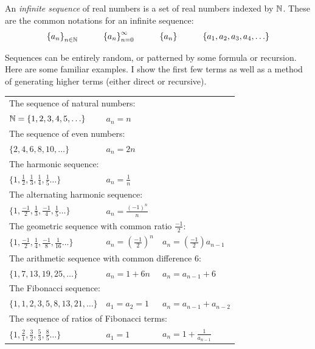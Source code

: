 \documentclass[fleqn]{report}
\begin{document}
\begin{defn}An \emph{infinite sequence} of real numbers is a set of real
numbers indexed by $\mathbb{N}$. These are the common notations for an
infinite sequence: 
\begin{equation*}
\left\{ a_n \right\}_{n \in \mathbb{N}} \hspace{1cm} 
\left\{ a_n \right\}_{n=0}^\infty \hspace{1cm} 
\left\{ a_n \right\} \hspace{1cm} 
\left\{ a_1, a_2, a_3, a_4, \ldots \right\}
\end{equation*}
\end{defn}
\begin{example}
Sequences can be entirely random, or patterned by some formula
or recursion. Here are some familiar examples. I show the
first few terms as well as a method of generating higher terms
(either direct or recursive). 

\begin{tabular}{lll}
\multicolumn{3}{l}{The sequence of natural numbers:} \\
$\mathbb{N} = \{ 1,2,3,4,5, \ldots \}$ & $a_n = n$ & \\
\multicolumn{3}{l}{The sequence of even numbers:} \\
$\{ 2,4,6,8,10, \ldots \}$ & $a_n = 2n$ & \\
\multicolumn{3}{l}{The harmonic sequence:} \\
$\{ 1,\frac{1}{2},\frac{1}{3},\frac{1}{4},\frac{1}{5} \ldots \}$
& $a_n = \frac{1}{n}$ & \\
\multicolumn{3}{l}{The alternating harmonic sequence:} \\
$\{ 1,\frac{-1}{2},\frac{1}{3},\frac{-1}{4},\frac{1}{5} \ldots \}$
& $a_n = \frac{(-1)^n}{n}$ & \\ 
\multicolumn{3}{l}{The geometric sequence with common ratio 
$\frac{-1}{2}:$} \\
$\{ 1,\frac{-1}{2},\frac{1}{4},\frac{-1}{8},\frac{1}{16} \ldots \}$
& $a_n = \left(\frac{-1}{2}\right)^n$ & $a_n = \left(
\frac{-1}{2} \right) a_{n-1}$ \\
\multicolumn{3}{l}{The arithmetic sequence with common
difference 6:} \\
$\{ 1,7,13,19,25, \ldots \}$ & $a_n = 1 + 6n$ & $a_n = a_{n-1} +
6$ \\
\multicolumn{3}{l}{The Fibonacci sequence:} \\
$\{1,1,2,3,5,8,13,21, \ldots \}$ & $a_1 = a_2 = 1$
& $a_n = a_{n-1} + a_{n-2}$ \\
\multicolumn{3}{l}{The sequence of ratios of Fibonacci terms:} \\
$\{ 1,\frac{2}{1},\frac{3}{2},\frac{5}{3},\frac{8}{5} \ldots \}$
& $a_1 = 1$ & $ a_n = 1 + \frac{1}{a_{n-1}}$
\end{tabular}
\end{example}
\end{document}
